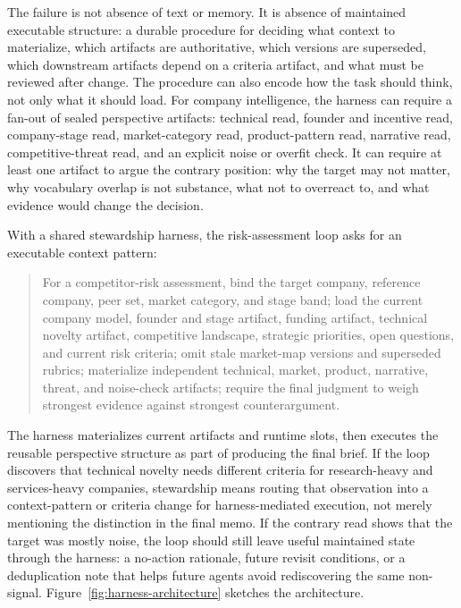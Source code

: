 \documentclass{article}
\begin{document}
The failure is not absence of text or memory. It is absence of maintained executable structure: a durable procedure for deciding what context to materialize, which artifacts are authoritative, which versions are superseded, which downstream artifacts depend on a criteria artifact, and what must be reviewed after change. The procedure can also encode how the task should think, not only what it should load. For company intelligence, the harness can require a fan-out of sealed perspective artifacts: technical read, founder and incentive read, company-stage read, market-category read, product-pattern read, narrative read, competitive-threat read, and an explicit noise or overfit check. It can require at least one artifact to argue the contrary position: why the target may not matter, why vocabulary overlap is not substance, what not to overreact to, and what evidence would change the decision.

With a shared stewardship harness, the risk-assessment loop asks for an executable context pattern:
\begin{quote}
For a competitor-risk assessment, bind the target company, reference company, peer set, market category, and stage band; load the current company model, founder and stage artifact, funding artifact, technical novelty artifact, competitive landscape, strategic priorities, open questions, and current risk criteria; omit stale market-map versions and superseded rubrics; materialize independent technical, market, product, narrative, threat, and noise-check artifacts; require the final judgment to weigh strongest evidence against strongest counterargument.
\end{quote}

The harness materializes current artifacts and runtime slots, then executes the reusable perspective structure as part of producing the final brief. If the loop discovers that technical novelty needs different criteria for research-heavy and services-heavy companies, stewardship means routing that observation into a context-pattern or criteria change for harness-mediated execution, not merely mentioning the distinction in the final memo. If the contrary read shows that the target was mostly noise, the loop should still leave useful maintained state through the harness: a no-action rationale, future revisit conditions, or a deduplication note that helps future agents avoid rediscovering the same non-signal. Figure~\ref{fig:harness-architecture} sketches the architecture.
\end{document}
